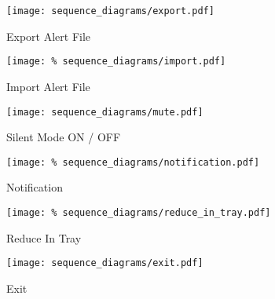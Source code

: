 \begin{figure}[]
	\centering
    \caption{Export Alert File}\label{fig:sd_export_alert_file}
    \texttt{[image: sequence\_diagrams/export.pdf]}
\end{figure}

\begin{figure}[]
	\centering
    \caption{Import Alert File}\label{fig:sd_import_alert_file}
    \texttt{[image: \%
    sequence\_diagrams/import.pdf]}
\end{figure}

\begin{figure}[]
	\centering
    \caption{Silent Mode ON / OFF}\label{fig:sd_silent_mode}
	\texttt{[image: sequence\_diagrams/mute.pdf]}
\end{figure}

\begin{figure}[]
	\centering
    \caption{Notification}\label{fig:sd_notification}
	\texttt{[image: \%
    sequence\_diagrams/notification.pdf]}
\end{figure}

\begin{figure}[]
	\centering
    \caption{Reduce In Tray}\label{fig:sd_reduce_in_tray}
	\texttt{[image: \%
    sequence\_diagrams/reduce\_in\_tray.pdf]}
\end{figure}

\begin{figure}[]
	\centering
    \caption{Exit}\label{fig:sd_exit}
	\texttt{[image: sequence\_diagrams/exit.pdf]}
\end{figure}
